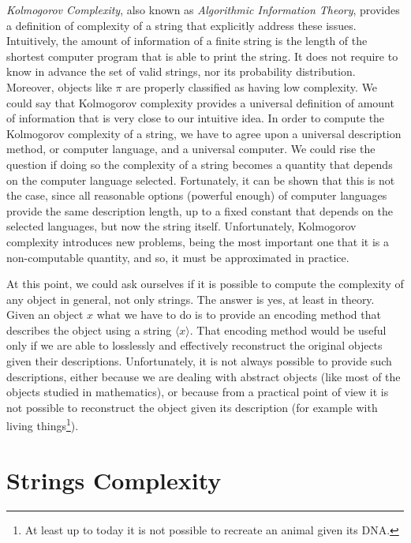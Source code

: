 \emph{Kolmogorov Complexity}, also known as \emph{Algorithmic Information Theory}, provides a definition of complexity of a string that explicitly address these issues. Intuitively, the amount of information of a finite string is the length of the shortest computer program that is able to print the string. It does not require to know in advance the set of valid strings, nor its probability distribution. Moreover, objects like $\pi$ are properly classified as having low complexity. We could say that Kolmogorov complexity provides a universal definition of amount of information that is very close to our intuitive idea. In order to compute the Kolmogorov complexity of a string, we have to agree upon a universal description method, or computer language, and a universal computer. We could rise the question if doing so the complexity of a string becomes a quantity that depends on the computer language selected. Fortunately, it can be shown that this is not the case, since all reasonable options (powerful enough) of computer languages provide the same description length, up to a fixed constant that depends on the selected languages, but now the string itself. Unfortunately, Kolmogorov complexity introduces new problems, being the most important one that it is a non-computable quantity, and so, it must be approximated in practice.

At this point, we could ask ourselves if it is possible to compute the complexity of any object in general, not only strings. The answer is yes, at least in theory. Given an object $x$ what we have to do is to provide an encoding method that describes the object using a string $\langle x \rangle$. That encoding method would be useful only if we are able to losslessly and effectively reconstruct the original objects given their descriptions. Unfortunately, it is not always possible to provide such descriptions, either because we are dealing with abstract objects (like most of the objects studied in mathematics), or because from a practical point of view it is not possible to reconstruct the object given its description (for example with living things\footnote{At least up to today it is not possible to recreate an animal given its DNA.}).

%
%

\section{Strings Complexity}
\label{sec:strings_complexity}

